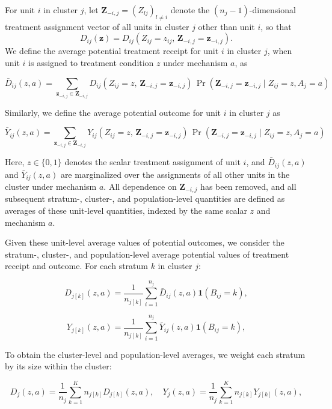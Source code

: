 \documentclass[a4paper, 12pt]{article}
\begin{document}
For unit $i$ in cluster $j$, let $\mathbf{Z}_{-i,j} = (Z_{lj})_{l \neq i}$ denote the $(n_j - 1)$-dimensional treatment assignment vector of all units in cluster $j$ other than unit $i$, so that
$$
D_{ij}(\mathbf{z}) = D_{ij}(Z_{ij} = z_{ij},\, \mathbf{Z}_{-i,j} = \mathbf{z}_{-i,j}).
$$
We define the average potential treatment receipt for unit $i$ in cluster $j$, when unit $i$ is assigned to treatment condition $z$ under mechanism $a$, as
 
$$\bar{D}_{ij}(z, a) = \sum_{\mathbf{z}_{-i,j} \in \mathbf{Z}_{-i,j}} D_{ij}(Z_{ij} = z,\, \mathbf{Z}_{-i,j} = \mathbf{z}_{-i,j})\, \Pr(\mathbf{Z}_{-i,j} = \mathbf{z}_{-i,j} \mid Z_{ij} = z, A_j = a)
$$

Similarly, we define the average potential outcome for unit $i$ in cluster $j$ as

$$\bar{Y}_{ij}(z, a) = \sum_{\mathbf{z}_{-i,j} \in \mathbf{Z}_{-i,j}} Y_{ij}(Z_{ij} = z,\, \mathbf{Z}_{-i,j} = \mathbf{z}_{-i,j})\, \Pr(\mathbf{Z}_{-i,j} = \mathbf{z}_{-i,j} \mid Z_{ij} = z, A_j = a)
$$

Here, $z \in \{0,1\}$ denotes the scalar treatment assignment of unit $i$, and $\bar{D}_{ij}(z, a)$ and $\bar{Y}_{ij}(z, a)$ are marginalized over the assignments of all other units in the cluster under mechanism $a$. All dependence on $\mathbf{Z}_{-i,j}$ has been removed, and all subsequent stratum-, cluster-, and population-level quantities are defined as averages of these unit-level quantities, indexed by the same scalar $z$ and mechanism $a$.

Given these unit-level average values of potential outcomes, we consider the stratum-, cluster-, and population-level average potential values of treatment receipt and outcome. For each stratum $k$ in cluster $j$:


$$
D_{j[k]}(z, a) = \frac{1}{n_{j[k]}} \sum_{i=1}^{n_j} \bar{D}_{ij}(z, a) \mathbf{1}(B_{ij} = k),
$$

$$
Y_{j[k]}(z, a) = \frac{1}{n_{j[k]}} \sum_{i=1}^{n_j} \bar{Y}_{ij}(z, a) \mathbf{1}(B_{ij} = k),
$$

To obtain the cluster-level and population-level averages, we weight each stratum by its size within the cluster:

$$
D_j(z, a) = \frac{1}{n_j} \sum_{k=1}^K n_{j[k]} D_{j[k]}(z, a),
\quad
Y_j(z, a) = \frac{1}{n_j} \sum_{k=1}^K n_{j[k]} Y_{j[k]}(z, a),
$$
\end{document}
